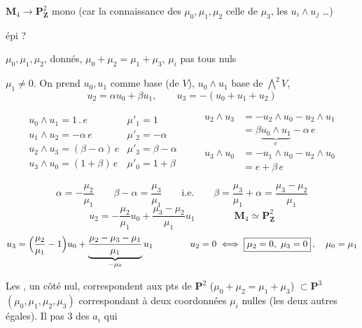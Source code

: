 \documentclass[11pt,a4paper]{article}
\begin{document}
$\mathbf{M}_4 \to \mathbf{P}^2_{\mathbf{Z}}$  mono (car la
connaissance des $\mu_0, \mu_1, \mu_2$  celle
de $\mu_3$,  les $u_i \wedge u_j$ \ldots)

épi ?

$\mu_0, \mu_1, \mu_2$,  donnés,
$\mu_0 + \mu_2 = \mu_1 + \mu_3$, $\mu_i$ pas tous nuls

\struck{\ill{}} $\mu_1 \neq 0$. On prend $u_0, u_1$ comme base (de $V$),
$u_0 \wedge u_1$ base  de $\bigwedge^2 V$,
\[
u_2 = \alpha u_0 + \beta u_1, \qquad u_3 = -(u_0 + u_1 + u_2)
\]

\[
\begin{array}{ll}
u_0 \wedge u_1 = 1\,.\,e & \mu'_1 = 1 \\
u_1 \wedge u_2 = -\alpha\, e & \mu'_2 = -\alpha \\
u_2 \wedge u_3 = (\beta - \alpha)\, e & \mu'_3 = \beta - \alpha \\
u_3 \wedge u_0 = (1 + \beta)\, e & \mu'_0 = 1 + \beta
\end{array}
\qquad
\begin{aligned}
u_2 \wedge u_3 &= -u_2 \wedge u_0 - u_2 \wedge u_1 \\
 &= \beta \underbrace{u_0 \wedge u_1}_{e} - \alpha\, e \\
u_3 \wedge u_0 &= -u_1 \wedge u_0 - u_2 \wedge u_0 \\
 &= e + \beta\, e
\end{aligned}
\]

\[
\alpha = -\frac{\mu_2}{\mu_1} \qquad \beta - \alpha = \frac{\mu_3}{\mu_1}
\qquad \text{i.e.} \qquad \beta = \frac{\mu_3}{\mu_1} + \alpha
= \frac{\mu_3 - \mu_2}{\mu_1}
\]
\[
u_2 = -\frac{\mu_2}{\mu_1} u_0 + \frac{\mu_3 - \mu_2}{\mu_1} u_1
\qquad\qquad \mathbf{M}_4 \simeq \mathbf{P}^2_{\mathbf{Z}}
\]
\[
u_3 = \Bigl( \frac{\mu_2}{\mu_1} - 1 \Bigr) u_0
+ \underbrace{\frac{\mu_2 - \mu_3 - \mu_1}{\mu_1}}_{-\mu_0} u_1
\qquad\qquad
u_2 = 0 \iff \boxed{\mu_2 = 0,\ \mu_3 = 0}\,,\quad \mu_0 = \mu_1
\]

Les  ,  un côté nul,
correspondent aux  pts 
de $\mathbf{P}^2$ ($\mu_0 + \mu_2 = \mu_1 + \mu_3$) $\subset
\mathbf{P}^3$ $(\mu_0, \mu_1, \mu_2, \mu_3)$ correspondant à deux
coordonnées  $\mu_i$ nulles (les deux autres égales).
Il  pas $3$ des $a_i$ qui
\end{document}
